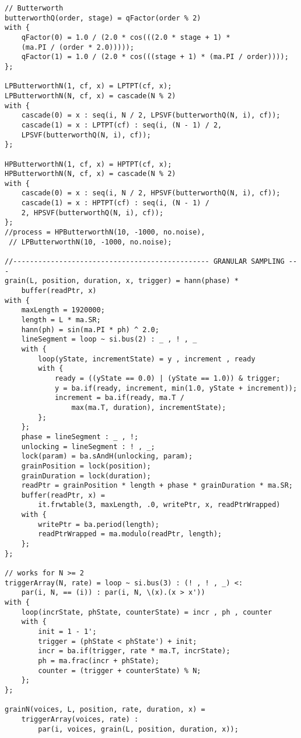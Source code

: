 \begin{lstlisting}
// Butterworth
butterworthQ(order, stage) = qFactor(order % 2)
with {
    qFactor(0) = 1.0 / (2.0 * cos(((2.0 * stage + 1) *
    (ma.PI / (order * 2.0)))));
    qFactor(1) = 1.0 / (2.0 * cos(((stage + 1) * (ma.PI / order))));
};

LPButterworthN(1, cf, x) = LPTPT(cf, x);
LPButterworthN(N, cf, x) = cascade(N % 2)
with {
    cascade(0) = x : seq(i, N / 2, LPSVF(butterworthQ(N, i), cf));
    cascade(1) = x : LPTPT(cf) : seq(i, (N - 1) / 2,
    LPSVF(butterworthQ(N, i), cf));
};

HPButterworthN(1, cf, x) = HPTPT(cf, x);
HPButterworthN(N, cf, x) = cascade(N % 2)
with {
    cascade(0) = x : seq(i, N / 2, HPSVF(butterworthQ(N, i), cf));
    cascade(1) = x : HPTPT(cf) : seq(i, (N - 1) /
    2, HPSVF(butterworthQ(N, i), cf));
};
//process = HPButterworthN(10, -1000, no.noise), 
 // LPButterworthN(10, -1000, no.noise);

//----------------------------------------------- GRANULAR SAMPLING ---
grain(L, position, duration, x, trigger) = hann(phase) * 
    buffer(readPtr, x)
with {
    maxLength = 1920000;
    length = L * ma.SR;
    hann(ph) = sin(ma.PI * ph) ^ 2.0;
    lineSegment = loop ~ si.bus(2) : _ , ! , _
    with {
        loop(yState, incrementState) = y , increment , ready
        with {
            ready = ((yState == 0.0) | (yState == 1.0)) & trigger;
            y = ba.if(ready, increment, min(1.0, yState + increment));
            increment = ba.if(ready, ma.T / 
                max(ma.T, duration), incrementState);
        };
    };
    phase = lineSegment : _ , !;
    unlocking = lineSegment : ! , _;
    lock(param) = ba.sAndH(unlocking, param); 
    grainPosition = lock(position);
    grainDuration = lock(duration);
    readPtr = grainPosition * length + phase * grainDuration * ma.SR;
    buffer(readPtr, x) = 
        it.frwtable(3, maxLength, .0, writePtr, x, readPtrWrapped)
    with {
        writePtr = ba.period(length);
        readPtrWrapped = ma.modulo(readPtr, length);
    };
};

// works for N >= 2
triggerArray(N, rate) = loop ~ si.bus(3) : (! , ! , _) <: 
    par(i, N, == (i)) : par(i, N, \(x).(x > x'))
with {
    loop(incrState, phState, counterState) = incr , ph , counter
    with {
        init = 1 - 1';
        trigger = (phState < phState') + init;
        incr = ba.if(trigger, rate * ma.T, incrState);
        ph = ma.frac(incr + phState);
        counter = (trigger + counterState) % N;
    };
};

grainN(voices, L, position, rate, duration, x) = 
    triggerArray(voices, rate) : 
        par(i, voices, grain(L, position, duration, x));


\end{lstlisting}
